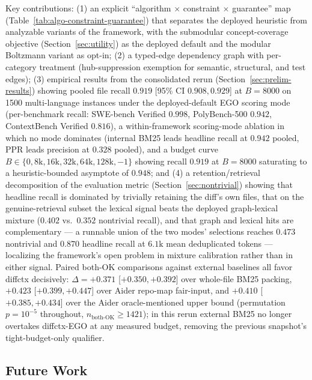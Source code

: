 \documentclass[11pt, a4paper]{article}
\begin{document}
Key contributions: (1) an explicit ``algorithm $\times$ constraint $\times$ guarantee'' map (Table~\ref{tab:algo-constraint-guarantee}) that separates the deployed heuristic from analyzable variants of the framework, with the submodular concept-coverage objective (Section~\ref{sec:utility}) as the deployed default and the modular Boltzmann variant as opt-in; (2) a typed-edge dependency graph with per-category treatment (hub-suppression exemption for semantic, structural, and test edges); (3) empirical results from the consolidated rerun (Section~\ref{sec:prelim-results}) showing pooled file recall $0.919$ [95\% CI $0.908, 0.929$] at $B{=}8000$ on 1500 multi-language instances under the deployed-default EGO scoring mode (per-benchmark recall: SWE-bench Verified $0.998$, PolyBench-500 $0.942$, ContextBench Verified $0.816$), a within-framework scoring-mode ablation in which no mode dominates (internal BM25 leads headline recall at $0.942$ pooled, PPR leads precision at $0.328$ pooled), and a budget curve $B \in \{0, 8\mathrm{k}, 16\mathrm{k}, 32\mathrm{k}, 64\mathrm{k}, 128\mathrm{k}, -1\}$ showing recall $0.919$ at $B{=}8000$ saturating to a heuristic-bounded asymptote of $0.948$; and (4) a retention/retrieval decomposition of the evaluation metric (Section~\ref{sec:nontrivial}) showing that headline recall is dominated by trivially retaining the diff's own files, that on the genuine-retrieval subset the lexical signal beats the deployed graph-lexical mixture ($0.402$ vs.\ $0.352$ nontrivial recall), and that graph and lexical hits are complementary --- a runnable union of the two modes' selections reaches $0.473$ nontrivial and $0.870$ headline recall at $6.1\mathrm{k}$ mean deduplicated tokens --- localizing the framework's open problem in mixture calibration rather than in either signal. Paired both-OK comparisons against external baselines all favor diffctx decisively: $\Delta = +0.371$ [$+0.350, +0.392$] over whole-file BM25 packing, $+0.423$ [$+0.399, +0.447$] over Aider repo-map fair-input, and $+0.410$ [$+0.385, +0.434$] over the Aider oracle-mentioned upper bound (permutation $p = 10^{-5}$ throughout, $n_{\mathrm{both\text{-}OK}} \geq 1421$); in this rerun external BM25 no longer overtakes diffctx-EGO at any measured budget, removing the previous snapshot's tight-budget-only qualifier.

\subsection{Future Work}
\label{sec:future-work}
\end{document}
